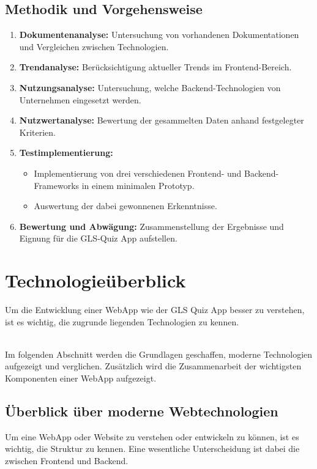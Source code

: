 \documentclass[biblatex]{lni}
\begin{document}
\subsection{Methodik und Vorgehensweise}

\begin{enumerate}
  \item \textbf{Dokumentenanalyse:} Untersuchung von vorhandenen Dokumentationen und Vergleichen zwischen Technologien.
  \item \textbf{Trendanalyse:} Berücksichtigung aktueller Trends im Frontend-Bereich.
  \item \textbf{Nutzungsanalyse:} Untersuchung, welche Backend-Technologien von Unternehmen eingesetzt werden.
  \item \textbf{Nutzwertanalyse:} Bewertung der gesammelten Daten anhand festgelegter Kriterien.
  \item \textbf{Testimplementierung:}
  \begin{itemize}
    \item Implementierung von drei verschiedenen Frontend- und Backend-Frameworks in einem minimalen Prototyp.
    \item Auswertung der dabei gewonnenen Erkenntnisse.
  \end{itemize}
  \item \textbf{Bewertung und Abwägung:} Zusammenstellung der Ergebnisse und Eignung für die GLS-Quiz App aufstellen.
\end{enumerate}

\section{Technologieüberblick}
\label{sec:tec-überblick}
Um die Entwicklung einer \ac{WebApp} wie der GLS Quiz App besser zu verstehen,
ist es wichtig, die zugrunde liegenden Technologien zu kennen.

\\

Im folgenden Abschnitt werden die Grundlagen geschaffen,
moderne Technologien aufgezeigt und verglichen.
Zusätzlich wird die Zusammenarbeit der wichtigsten Komponenten einer \ac{WebApp} aufgezeigt.

\subsection{Überblick über moderne Webtechnologien}
\label{sec:moderne-webtechnologien}

Um eine \ac{WebApp} oder Website zu verstehen oder entwickeln zu können, ist es wichtig, die Struktur zu kennen.
Eine wesentliche Unterscheidung ist dabei die zwischen Frontend und Backend.
\end{document}
